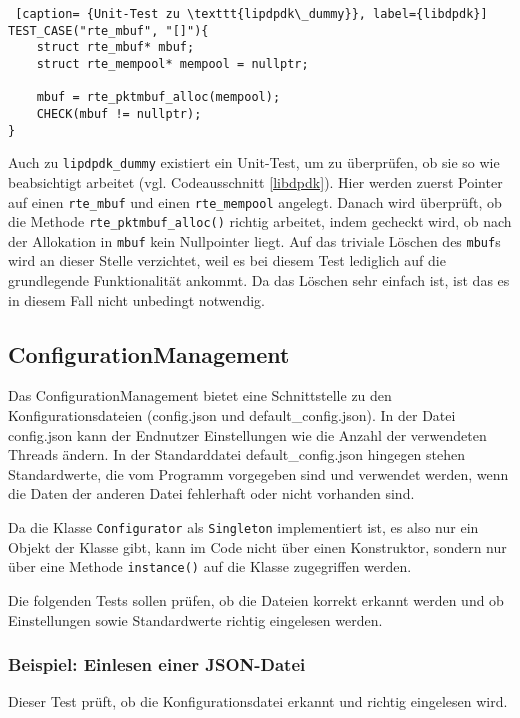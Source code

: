 \documentclass[../review_3.tex]{subfiles}
\begin{document}
\begin{lstlisting} [caption= {Unit-Test zu \texttt{lipdpdk\_dummy}}, label={libdpdk}]
TEST_CASE("rte_mbuf", "[]"){
    struct rte_mbuf* mbuf;
    struct rte_mempool* mempool = nullptr;
    
    mbuf = rte_pktmbuf_alloc(mempool);
    CHECK(mbuf != nullptr);
}
\end{lstlisting}

Auch zu \texttt{lipdpdk\_dummy} existiert ein Unit-Test, um zu überprüfen, ob sie so wie beabsichtigt arbeitet (vgl. Codeausschnitt \ref{libdpdk}). Hier werden zuerst Pointer auf einen \texttt{rte\_mbuf} und einen \texttt{rte\_mempool} angelegt. Danach wird überprüft, ob die Methode \texttt{rte\_pktmbuf\_alloc()} richtig arbeitet, indem gecheckt wird, ob nach der Allokation in \texttt{mbuf} kein Nullpointer liegt. Auf das triviale Löschen des \texttt{mbuf}s wird an dieser Stelle verzichtet, weil es bei diesem Test lediglich auf die grundlegende Funktionalität ankommt. Da das Löschen sehr einfach ist, ist das es in diesem Fall nicht unbedingt notwendig.

\subsection{ConfigurationManagement}

Das ConfigurationManagement bietet eine Schnittstelle zu den Konfigurationsdateien (config.json und default\_config.json). In der Datei config.json kann der Endnutzer Einstellungen wie die Anzahl der verwendeten Threads ändern. In der Standarddatei default\_config.json hingegen stehen Standardwerte, die vom Programm vorgegeben sind und verwendet werden, wenn die Daten der anderen Datei fehlerhaft oder nicht vorhanden sind.

Da die Klasse \texttt{Configurator} als \texttt{Singleton} implementiert ist, es also nur ein Objekt der Klasse gibt, kann im Code nicht über einen Konstruktor, sondern nur über eine Methode \texttt{instance()} auf die Klasse zugegriffen werden.

Die folgenden Tests sollen prüfen, ob die Dateien korrekt erkannt werden und ob Einstellungen sowie Standardwerte richtig eingelesen werden.

\subsubsection{Beispiel: Einlesen einer JSON-Datei}

Dieser Test prüft, ob die Konfigurationsdatei erkannt und richtig eingelesen wird.
\end{document}
